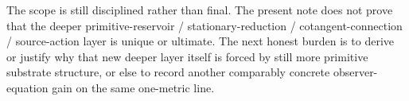 \documentclass[11pt]{article}
\begin{document}
The scope is still disciplined rather than final. The present note does not prove that the deeper primitive-reservoir / stationary-reduction / cotangent-connection / source-action layer is unique or ultimate. The next honest burden is to derive or justify why that new deeper layer itself is forced by still more primitive substrate structure, or else to record another comparably concrete observer-equation gain on the same one-metric line.
\end{document}
